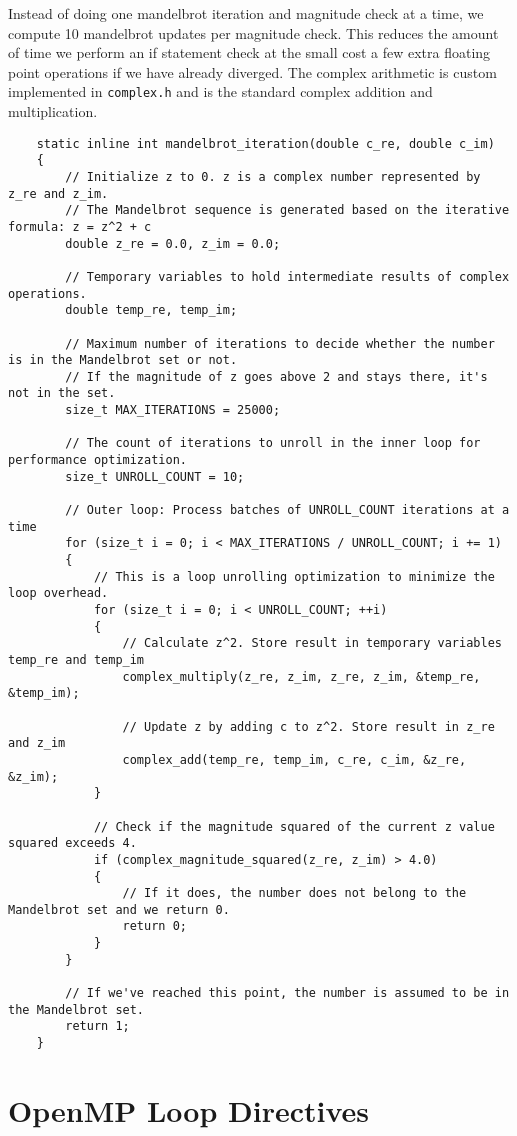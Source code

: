 \documentclass{article}
\begin{document}
Instead of doing one mandelbrot iteration and magnitude check at a time, we compute 
10 mandelbrot updates per magnitude check. This reduces the amount of time we 
perform an if statement check at the small cost a few extra floating point operations 
if we have already diverged. The complex arithmetic is custom implemented in \texttt{complex.h} and 
is the standard complex addition and multiplication.
\begin{lstlisting}
    static inline int mandelbrot_iteration(double c_re, double c_im)
    {
        // Initialize z to 0. z is a complex number represented by z_re and z_im.
        // The Mandelbrot sequence is generated based on the iterative formula: z = z^2 + c
        double z_re = 0.0, z_im = 0.0;
    
        // Temporary variables to hold intermediate results of complex operations.
        double temp_re, temp_im;
    
        // Maximum number of iterations to decide whether the number is in the Mandelbrot set or not.
        // If the magnitude of z goes above 2 and stays there, it's not in the set.
        size_t MAX_ITERATIONS = 25000;
    
        // The count of iterations to unroll in the inner loop for performance optimization.
        size_t UNROLL_COUNT = 10;
    
        // Outer loop: Process batches of UNROLL_COUNT iterations at a time
        for (size_t i = 0; i < MAX_ITERATIONS / UNROLL_COUNT; i += 1)
        {
            // This is a loop unrolling optimization to minimize the loop overhead.
            for (size_t i = 0; i < UNROLL_COUNT; ++i)
            {
                // Calculate z^2. Store result in temporary variables temp_re and temp_im
                complex_multiply(z_re, z_im, z_re, z_im, &temp_re, &temp_im);
    
                // Update z by adding c to z^2. Store result in z_re and z_im
                complex_add(temp_re, temp_im, c_re, c_im, &z_re, &z_im);
            }
    
            // Check if the magnitude squared of the current z value squared exceeds 4.
            if (complex_magnitude_squared(z_re, z_im) > 4.0)
            {
                // If it does, the number does not belong to the Mandelbrot set and we return 0.
                return 0;
            }
        }
    
        // If we've reached this point, the number is assumed to be in the Mandelbrot set.
        return 1;
    }
\end{lstlisting}

\section{OpenMP Loop Directives}
\end{document}
